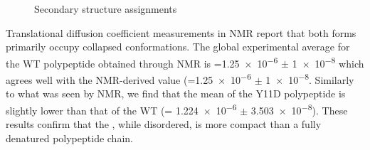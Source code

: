 \begin{figure}
	\centering     %
	\caption{Secondary structure assignments}
\end{figure}


Translational diffusion coefficient measurements in NMR report that both \gct{} forms primarily occupy collapsed conformations. The global experimental average for the WT polypeptide obtained through NMR is \diffusion{}=\num{1.25e-6} $\pm$  \SI{1e-8}{\dcunits} which agrees well with the NMR-derived value (\diffusion=\num{1.25e-6} $\pm$  \SI{1e-8}{\dcunits}. Similarly to what was seen by NMR, we find that the mean \diffusion of the Y11D \gct{} polypeptide is slightly lower than that of the WT \gct{} (\diffusion= \num{1.224e-6} $\pm$ \SI{3.503e-8}{\dcunits}). These results confirm that the \gct{}, while disordered, is more compact than a fully denatured polypeptide chain.

